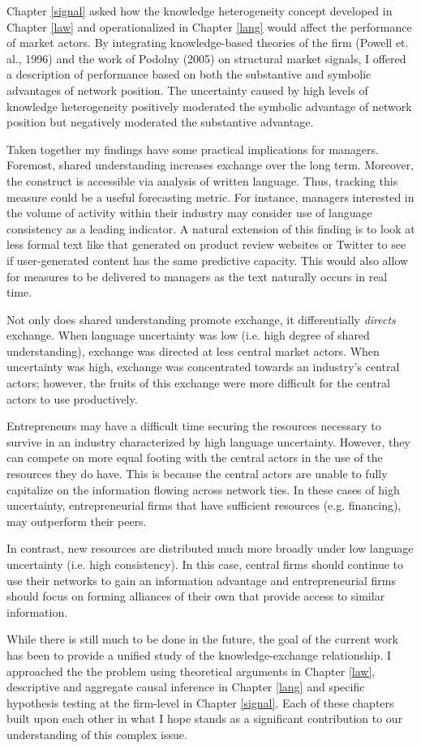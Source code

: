 Chapter \ref{signal} asked how the knowledge heterogeneity concept developed in Chapter \ref{law} and operationalized in Chapter \ref{lang} would affect the performance of market actors. By integrating knowledge-based theories of the firm (Powell et. al., 1996) and the work of Podolny (2005) on structural market signals, I offered a description of performance based on both the substantive and symbolic advantages of network position. The uncertainty caused by high levels of knowledge heterogeneity positively moderated the symbolic advantage of network position but negatively moderated the substantive advantage.

Taken together my findings have some practical implications for managers. Foremost, shared understanding increases exchange over the long term. Moreover, the construct is accessible via analysis of written language. Thus, tracking this measure could be a useful forecasting metric. For instance, managers interested in the volume of activity within their industry may consider use of language consistency as a leading indicator. A natural extension of this finding is to look at less formal text like that generated on product review websites or Twitter to see if user-generated content has the same predictive capacity. This would also allow for measures to be delivered to managers as the text naturally occurs in real time.

Not only does shared understanding promote exchange, it differentially \emph{directs} exchange. When language uncertainty was low (i.e. high degree of shared understanding), exchange was directed at less central market actors. When uncertainty was high, exchange was concentrated towards an industry's central actors; however, the fruits of this exchange were more difficult for the central actors to use productively. 

Entrepreneurs may have a difficult time securing the resources necessary to survive in an industry characterized by high language uncertainty. However, they can compete on more equal footing with the central actors in the use of the resources they do have. This is because the central actors are unable to fully capitalize on the information flowing across network ties. In these cases of high uncertainty, entrepreneurial firms that have sufficient resources (e.g. financing), may outperform their peers.

In contrast, new resources are distributed much more broadly under low language uncertainty (i.e. high consistency). In this case, central firms should continue to use their networks to gain an information advantage and entrepreneurial firms should focus on forming alliances of their own that provide access to similar information.

While there is still much to be done in the future, the goal of the current work has been to provide a unified study of the knowledge-exchange relationship. I approached the the problem using theoretical arguments in Chapter \ref{law}, descriptive and aggregate causal inference in Chapter \ref{lang} and specific hypothesis testing at the firm-level in Chapter \ref{signal}. Each of these chapters built upon each other in what I hope stands as a significant contribution to our understanding of this complex issue.

